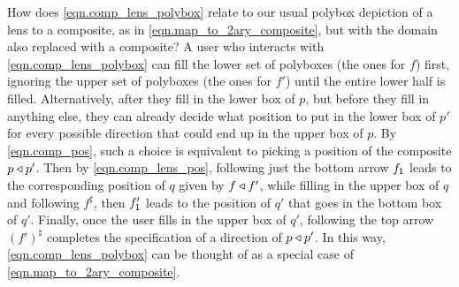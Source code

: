 \documentclass[Book-Poly]{subfiles}
\begin{document}
How does \eqref{eqn.comp_lens_polybox} relate to our usual polybox depiction of a lens to a composite, as in \eqref{eqn.map_to_2ary_composite}, but with the domain also replaced with a composite?
A user who interacts with \eqref{eqn.comp_lens_polybox} can fill the lower set of polyboxes (the ones for $f$) first, ignoring the upper set of polyboxes (the ones for $f'$) until the entire lower half is filled.
Alternatively, after they fill in the lower box of $p$, but before they fill in anything else, they can already decide what position to put in the lower box of $p'$ for every possible direction that could end up in the upper box of $p$.
By \eqref{eqn.comp_pos}, such a choice is equivalent to picking a position of the composite $p\mathbin{\triangleleft} p'$.
Then by \eqref{eqn.comp_lens_pos}, following just the bottom arrow $f_{\textsf{1}}$ leads to the corresponding position of $q$ given by $f\mathbin{\triangleleft} f'$, while filling in the upper box of $q$ and following $f^\sharp$, then $f'_{\textsf{1}}$ leads to the position of $q'$ that goes in the bottom box of $q'$.
Finally, once the user fills in the upper box of $q'$, following the top arrow $(f')^\sharp$ completes the specification of a direction of $p\mathbin{\triangleleft} p'$.
In this way, \eqref{eqn.comp_lens_polybox} can be thought of as a special case of \eqref{eqn.map_to_2ary_composite}.
\end{document}
